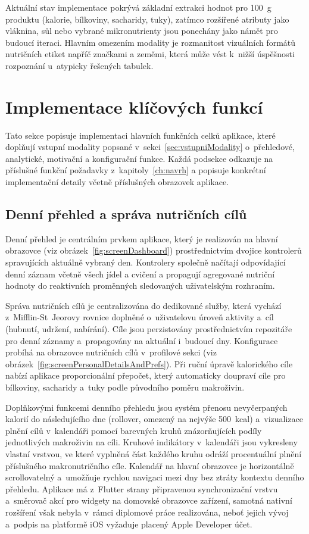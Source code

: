 Aktuální stav implementace pokrývá základní extrakci hodnot pro 100~g produktu (kalorie, bílkoviny, sacharidy, tuky), zatímco rozšířené atributy jako vláknina, sůl nebo vybrané mikronutrienty jsou ponechány jako námět pro budoucí iteraci.
Hlavním omezením modality je rozmanitost vizuálních formátů nutričních etiket napříč značkami a zeměmi, která může vést k~nižší úspěšnosti rozpoznání u~atypicky řešených tabulek.

\section{Implementace klíčových funkcí}
\label{sec:klicoveFunkce}

Tato sekce popisuje implementaci hlavních funkčních celků aplikace, které doplňují vstupní modality popsané v~sekci~\ref{sec:vstupniModality} o~přehledové, analytické, motivační a konfigurační funkce.
Každá podsekce odkazuje na příslušné funkční požadavky z~kapitoly~\ref{ch:navrh} a popisuje konkrétní implementační detaily včetně příslušných obrazovek aplikace.

\subsection{Denní přehled a správa nutričních cílů}
\label{subsec:dennPrehled}

Denní přehled je centrálním prvkem aplikace, který je realizován na hlavní obrazovce (viz obrázek~\ref{fig:screenDashboard}) prostřednictvím dvojice kontrolerů spravujících aktuálně vybraný den.
Kontrolery společně načítají odpovídající denní záznam včetně všech jídel a cvičení a propagují agregované nutriční hodnoty do reaktivních proměnných sledovaných uživatelským rozhraním.

Správa nutričních cílů je centralizována do dedikované služby, která vychází z~Mifflin-St~Jeorovy rovnice doplněné o~uživatelovu úroveň aktivity a~cíl (hubnutí, udržení, nabírání).
Cíle jsou perzistovány prostřednictvím repozitáře pro denní záznamy a~propagovány na aktuální i~budoucí dny.
Konfigurace probíhá na obrazovce nutričních cílů v~profilové sekci (viz obrázek~\ref{fig:screenPersonalDetailsAndPrefs}).
Při ruční úpravě kalorického cíle nabízí aplikace proporcionální přepočet, který automaticky doupraví cíle pro bílkoviny, sacharidy a~tuky podle původního poměru makroživin.

Doplňkovými funkcemi denního přehledu jsou systém přenosu nevyčerpaných kalorií do následujícího dne (rollover, omezený na nejvýše 500~kcal) a~vizualizace plnění cílů v~kalendáři pomocí barevných kruhů znázorňujících podíly jednotlivých makroživin na cíli.
Kruhové indikátory v~kalendáři jsou vykresleny vlastní vrstvou, ve které vyplněná část každého kruhu odráží procentuální plnění příslušného makronutričního cíle.
Kalendář na hlavní obrazovce je horizontálně scrollovatelný a~umožňuje rychlou navigaci mezi dny bez ztráty kontextu denního přehledu.
Aplikace má z~Flutter strany připravenou synchronizační vrstvu a~směrovač akcí pro widgety na domovské obrazovce zařízení, samotná nativní rozšíření však nebyla v~rámci diplomové práce realizována, neboť jejich vývoj a~podpis na platformě iOS vyžaduje placený Apple Developer účet.


